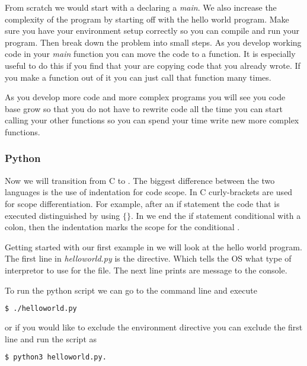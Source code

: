 From scratch we would start with a declaring a \emph{main}. We also increase the complexity of the program by starting off with the hello world program. Make sure you have your environment setup correctly so you can compile and run your program. Then break down the problem into small steps. As you develop working code in your \emph{main} function you can move the code to a function. It is especially useful to do this if you find that your are copying code that you already wrote. If you make a function out of it you can just call that function many times. 

As you develop more code and more complex programs you will see you code base grow so that you do not have to rewrite code all the time you can start calling your other functions so you can spend your time write new more complex functions. 

\subsubsection{Python}

Now we will transition from C to . The biggest difference between the two languages is the use of indentation for code scope. In C curly-brackets are used for scope differentiation. For example, after an if statement the code that is executed distinguished by using $\{\}$. In  we end the if statement conditional with a colon, then the indentation marks the scope for the conditional \cite{pyref}. 

Getting started with our first example in  we will look at the hello world program. The first line in \emph{helloworld.py} is the directive. Which tells the \ac{OS} what type of interpretor to use for the file. The next line prints are message to the console. 



To run the python script we can go to the command line and execute

\begin{lstlisting}[language=bash]
    $ ./helloworld.py
\end{lstlisting}

or if you would like to exclude the environment directive you can exclude the first line and run the script as

\begin{lstlisting}[language=bash]
    $ python3 helloworld.py.
\end{lstlisting}

